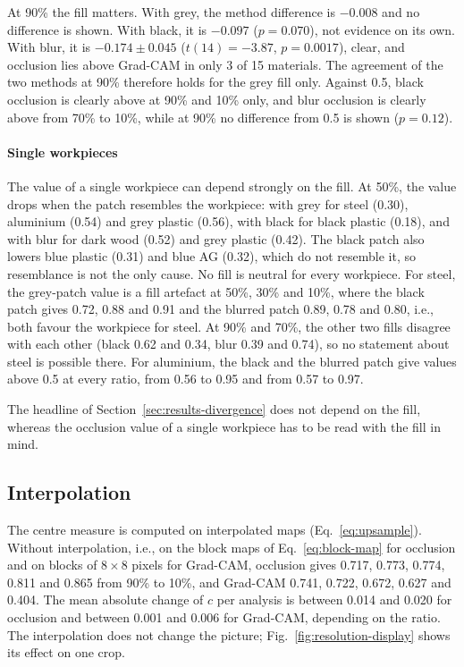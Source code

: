 At 90\% the fill matters. With grey, the method difference is $-0.008$ and no
difference is shown. With black, it is $-0.097$ ($p = 0.070$), not evidence on its own.
With blur, it is $-0.174 \pm 0.045$ ($t(14) = -3.87$, $p = 0.0017$), clear, and
occlusion lies above Grad-CAM in only 3 of 15 materials. The agreement of the two
methods at 90\% therefore holds for the grey fill only. Against 0.5, black occlusion is
clearly above at 90\% and 10\% only, and blur occlusion is clearly above from 70\% to
10\%, while at 90\% no difference from 0.5 is shown ($p = 0.12$).

\paragraph{Single workpieces}
The value of a single workpiece can depend strongly on the fill. At 50\%, the value drops when the patch resembles the workpiece:
with grey for steel (0.30), aluminium (0.54) and grey plastic (0.56), with black for
black plastic (0.18), and with blur for dark wood (0.52) and grey plastic (0.42). The
black patch also lowers blue plastic (0.31) and blue AG (0.32), which do not resemble
it, so resemblance is not the only cause. No
fill is neutral for every workpiece. For steel, the grey-patch value is a fill artefact
at 50\%, 30\% and 10\%, where the black patch gives 0.72, 0.88 and 0.91 and the
blurred patch 0.89, 0.78 and 0.80, i.e., both favour the workpiece for steel. At 90\% and 70\%, the other two fills disagree with each other (black 0.62
and 0.34, blur 0.39 and 0.74), so no statement about steel is possible there. For
aluminium, the black and the blurred patch give values above 0.5 at every ratio, from
0.56 to 0.95 and from 0.57 to 0.97.

The headline of Section~\ref{sec:results-divergence} does not depend on the fill,
whereas the occlusion value of a single workpiece has to be read with the fill in mind.

\subsection{Interpolation}
\label{sec:results-interpolation}

The centre measure is computed on interpolated maps (Eq.~\eqref{eq:upsample}). Without
interpolation, i.e., on the block maps of Eq.~\eqref{eq:block-map} for occlusion and on
blocks of $8 \times 8$ pixels for Grad-CAM, occlusion gives 0.717, 0.773, 0.774, 0.811
and 0.865 from 90\% to 10\%, and Grad-CAM 0.741, 0.722, 0.672, 0.627 and 0.404. The mean
absolute change of $c$ per analysis is between 0.014 and 0.020 for occlusion and between
0.001 and 0.006 for Grad-CAM, depending on the ratio. The interpolation does not change
the picture; Fig.~\ref{fig:resolution-display} shows its effect on one crop.

